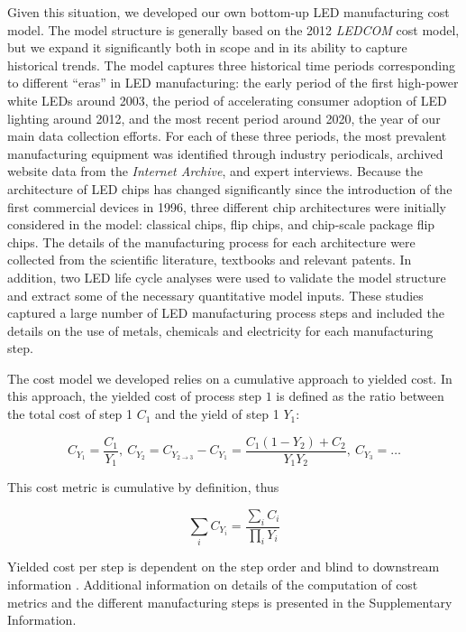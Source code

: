 \documentclass[twoside,twocolumn,9pt]{article}
\begin{document}
Given this situation, we developed our own bottom-up LED manufacturing cost model. The model structure is generally based on the 2012 \textit{LEDCOM} cost model, but we expand it significantly both in scope and in its ability to capture historical trends. The model captures three historical time periods corresponding to different “eras” in LED manufacturing: the early period of the first high-power white LEDs around 2003, the period of accelerating consumer adoption of LED lighting around 2012, and the most recent period around 2020, the year of our main data collection efforts. For each of these three periods, the most prevalent manufacturing equipment was identified through industry periodicals, archived website data from the \textit{Internet Archive}, and expert interviews. Because the architecture of LED chips has changed significantly since the introduction of the first commercial devices in 1996, three different chip architectures were initially considered in the model: classical chips, flip chips, and chip-scale package flip chips. The details of the manufacturing process for each architecture were collected from the scientific literature, textbooks and relevant patents. In addition, two LED life cycle analyses \cite{scholand2012life}\cite{casamayor2018comparative} were used to validate the model structure and extract some of the necessary quantitative model inputs. These studies captured a large number of LED manufacturing process steps and included the details on the use of metals, chemicals and electricity for each manufacturing step.  

The cost model we developed relies on a cumulative approach to yielded cost\cite{becker2001use}. In this approach, the yielded cost of process step $1$ is defined as the ratio between the total cost of step 1 $C_1$ and the yield of step 1 $Y_1$:

\begin{equation}
    C_{Y_1} = \frac{C_1}{Y_1}, \ C_{Y_2} = C_{Y_{2 \rightarrow 3}} - C_{Y_1} = \frac{C_1(1-Y_2)+C_2}{Y_1Y_2}, \ C_{Y_3}=\dots
\end{equation}

This cost metric is cumulative by definition, thus

\begin{equation}
    \sum_i C_{Y_i} = \frac{\sum_i C_i}{\prod_i Y_i}
\end{equation}

Yielded cost per step is dependent on the step order and blind to downstream information \cite{becker2001use}. Additional information on details of the computation of cost metrics and the different manufacturing steps is presented in the Supplementary Information.
\end{document}
